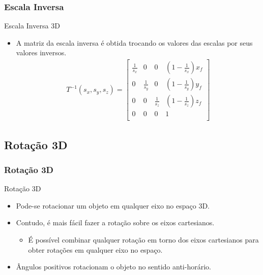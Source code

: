 \documentclass{beamer}
\begin{document}
\begin{frame}
\frametitle{Escala Inversa}

	\begin{block}{Escala Inversa 3D}
		\begin{itemize}
			\item A matriz da escala inversa é obtida trocando os valores das escalas por seus valores inversos.
			\begin{eqnarray*}
				T^{-1}(s_x,s_y,s_z) = \begin{bmatrix}
					\frac{1}{s_x}	&	0	&	0	&	(1-\frac{1}{s_x})x_f	\\
					0	&	\frac{1}{s_y}	&	0	&	(1-\frac{1}{s_y})y_f	\\
					0	&	0	& 	\frac{1}{s_z}	&	(1-\frac{1}{s_z})z_f	\\
					0	&	0	&	0	&	1	\\
				\end{bmatrix}
			\end{eqnarray*}
		\end{itemize}
	\end{block}
\end{frame}


\subsection{Rotação 3D}
\begin{frame}
\frametitle{Rotação 3D}

	\begin{block}{Rotação 3D}
		\begin{itemize}
			\item Pode-se rotacionar um objeto em qualquer eixo no espaço 3D.
			\item Contudo, é mais fácil fazer a rotação sobre os eixos cartesianos.
				\begin{itemize}
					\item É possível combinar qualquer rotação em torno dos eixos cartesianos para obter rotações em qualquer eixo no espaço.
				\end{itemize}
			\item Ângulos positivos rotacionam o objeto no sentido anti-horário.
		\end{itemize}
	\end{block}
\end{frame}
\end{document}
